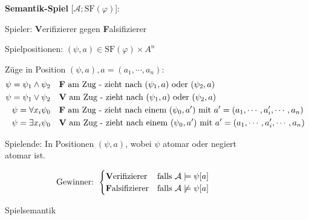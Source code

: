         \begin{figure}[ht]
            \begin{mdframed}
                \textbf{Semantik-Spiel} [$ \mathcal{A}; \text{SF}(\varphi) $]:

                Spieler: \textbf Verifizierer gegen \textbf Falsifizierer

                \vspace{0.1cm}

                Spielpositionen: $ (\psi, a) \in \text{SF}(\varphi) \times A ^ n $

                \vspace{0.1cm}

                Züge in Position $ (\psi, a), a = (a _ 1, \cdots, a _ n) $:
                \vspace{0pt}
                \begin{align*}
                    \psi = \psi _ 1 \land \psi _ 2 & \quad\text{\textbf{F} am Zug - zieht nach $ (\psi _ 1, a) $ oder $ (\psi _ 2, a) $} \\
                    \psi = \psi _ 1 \lor \psi _ 2  & \quad\text{\textbf{V} am Zug - zieht nach $ (\psi _ 1, a) $ oder $ (\psi _ 2, a) $} \\
                    \psi = \forall x _ i \psi _ 0  & \quad\text{\textbf{F} am Zug - zieht nach einem $ (\psi _ 0, a') $ mit $ a' = (a _ 1, \cdots, a _ i ', \cdots, a _ n) $} \\
                    \psi = \exists x _ i \psi _ 0  & \quad\text{\textbf{V} am Zug - zieht nach einem $ (\psi _ 0, a') $ mit $ a' = (a _ 1, \cdots, a _ i ', \cdots, a _ n) $} \\
                \end{align*}

                \vspace{0.1cm}

                Spielende: In Positionen $ (\psi, a) $, wobei $ \psi $ atomar oder negiert atomar ist.

                \vspace{0.1cm}

                \begin{equation*}
                    \text{Gewinner: }
                    \begin{cases}
                        \text{\textbf Verifizierer} & \text{falls } \mathcal{A} \models \psi[a] \\
                        \text{\textbf Falsifizierer} & \text{falls } \mathcal{A} \not\models \psi[a] \\
                    \end{cases}
                \end{equation*}
            \end{mdframed}
            \caption{Spielsemantik}
            \label{fig:spielsemantik}
        \end{figure}


